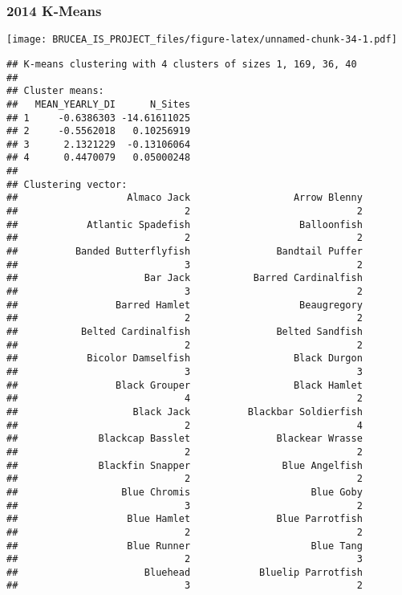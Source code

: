 \documentclass[
]{article}
\begin{document}
\hypertarget{k-means-8}{%
\subsubsection{2014 K-Means}\label{k-means-8}}

\texttt{[image: BRUCEA\_IS\_PROJECT\_files/figure-latex/unnamed-chunk-34-1.pdf]}

\begin{verbatim}
## K-means clustering with 4 clusters of sizes 1, 169, 36, 40
## 
## Cluster means:
##   MEAN_YEARLY_DI      N_Sites
## 1     -0.6386303 -14.61611025
## 2     -0.5562018   0.10256919
## 3      2.1321229  -0.13106064
## 4      0.4470079   0.05000248
## 
## Clustering vector:
##                   Almaco Jack                  Arrow Blenny 
##                             2                             2 
##            Atlantic Spadefish                   Balloonfish 
##                             2                             2 
##          Banded Butterflyfish               Bandtail Puffer 
##                             3                             2 
##                      Bar Jack           Barred Cardinalfish 
##                             3                             2 
##                 Barred Hamlet                   Beaugregory 
##                             2                             2 
##           Belted Cardinalfish               Belted Sandfish 
##                             2                             2 
##            Bicolor Damselfish                  Black Durgon 
##                             3                             3 
##                 Black Grouper                  Black Hamlet 
##                             4                             2 
##                    Black Jack          Blackbar Soldierfish 
##                             2                             4 
##              Blackcap Basslet               Blackear Wrasse 
##                             2                             2 
##              Blackfin Snapper                Blue Angelfish 
##                             2                             2 
##                  Blue Chromis                     Blue Goby 
##                             3                             2 
##                   Blue Hamlet               Blue Parrotfish 
##                             2                             2 
##                   Blue Runner                     Blue Tang 
##                             2                             3 
##                      Bluehead            Bluelip Parrotfish 
##                             3                             2 

\end{verbatim}
\end{document}

